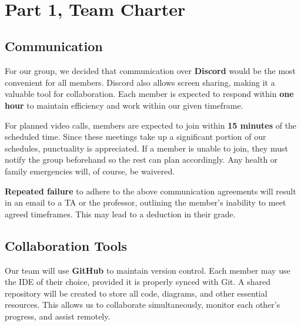 \documentclass{article}
\begin{document}
\begin{onehalfspace}

\tableofcontents
{}
~\\
\newpage


\section*{Part 1, Team Charter}
\subsection*{Communication}
\large{For our group, we decided that communication over \textbf{Discord} would be the most convenient for all members. Discord also allows screen sharing, making it a valuable tool for collaboration. Each member is expected to respond within \textbf{one hour} to maintain efficiency and work within our given timeframe.

For planned video calls, members are expected to join within \textbf{15 minutes} of the scheduled time. Since these meetings take up a significant portion of our schedules, punctuality is appreciated. If a member is unable to join, they must notify the group beforehand so the rest can plan accordingly. Any health or family emergencies will, of course, be waivered.

\textbf{Repeated failure} to adhere to the above communication agreements will result in an email to a TA or the professor, outlining the member's inability to meet agreed timeframes. This may lead to a deduction in their grade.

\subsection*{Collaboration Tools}

Our team will use \textbf{GitHub} to maintain version control. Each member may use the IDE of their choice, provided it is properly synced with Git. A shared repository will be created to store all code, diagrams, and other essential resources. This allows us to collaborate simultaneously, monitor each other's progress, and assist remotely.

}
\end{onehalfspace}
\end{document}

